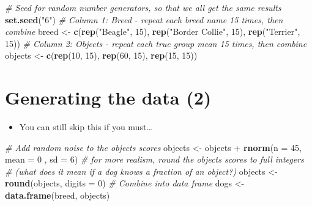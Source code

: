 \documentclass[]{article}
\newenvironment{Shaded}{}{}
\newcommand{\KeywordTok}[1]{\textcolor[rgb]{0.00,0.44,0.13}{\textbf{{#1}}}}
\newcommand{\DataTypeTok}[1]{\textcolor[rgb]{0.56,0.13,0.00}{{#1}}}
\newcommand{\DecValTok}[1]{\textcolor[rgb]{0.25,0.63,0.44}{{#1}}}
\newcommand{\StringTok}[1]{\textcolor[rgb]{0.25,0.44,0.63}{{#1}}}
\newcommand{\CommentTok}[1]{\textcolor[rgb]{0.38,0.63,0.69}{\textit{{#1}}}}
\newcommand{\NormalTok}[1]{{#1}}
\begin{document}
\begin{Shaded}
\begin{Highlighting}[]
\CommentTok{# Seed for random number generators, so that we all get the same results}
\KeywordTok{set.seed}\NormalTok{(}\StringTok{"6"}\NormalTok{)}
\CommentTok{# Column 1: Breed - repeat each breed name 15 times, then combine}
\NormalTok{breed <-}\StringTok{ }\KeywordTok{c}\NormalTok{(}\KeywordTok{rep}\NormalTok{(}\StringTok{"Beagle"}\NormalTok{, }\DecValTok{15}\NormalTok{), }\KeywordTok{rep}\NormalTok{(}\StringTok{"Border Collie"}\NormalTok{, }\DecValTok{15}\NormalTok{), }\KeywordTok{rep}\NormalTok{(}\StringTok{"Terrier"}\NormalTok{, }\DecValTok{15}\NormalTok{))}
\CommentTok{# Column 2: Objects - repeat each true group mean 15 times, then combine}
\NormalTok{objects <-}\StringTok{ }\KeywordTok{c}\NormalTok{(}\KeywordTok{rep}\NormalTok{(}\DecValTok{10}\NormalTok{, }\DecValTok{15}\NormalTok{), }\KeywordTok{rep}\NormalTok{(}\DecValTok{60}\NormalTok{, }\DecValTok{15}\NormalTok{), }\KeywordTok{rep}\NormalTok{(}\DecValTok{15}\NormalTok{, }\DecValTok{15}\NormalTok{))}
\end{Highlighting}
\end{Shaded}

\section{Generating the data (2)}\label{generating-the-data-2}

\begin{itemize}
\itemsep1pt\parskip0pt
\item
  You can still skip this if you must\ldots{}
\end{itemize}

\begin{Shaded}
\begin{Highlighting}[]
\CommentTok{# Add random noise to the objects scores}
\NormalTok{objects <-}\StringTok{ }\NormalTok{objects +}\StringTok{ }\KeywordTok{rnorm}\NormalTok{(}\DataTypeTok{n =} \DecValTok{45}\NormalTok{, }\DataTypeTok{mean =} \DecValTok{0} \NormalTok{, }\DataTypeTok{sd =} \DecValTok{6}\NormalTok{)}
\CommentTok{# for more realism, round the objects scores to full integers}
\CommentTok{# (what does it mean if a dog knows a fraction of an object?)}
\NormalTok{objects <-}\StringTok{ }\KeywordTok{round}\NormalTok{(objects, }\DataTypeTok{digits =} \DecValTok{0}\NormalTok{)}
\CommentTok{# Combine into data frame}
\NormalTok{dogs <-}\StringTok{ }\KeywordTok{data.frame}\NormalTok{(breed, objects)}
\end{Highlighting}
\end{Shaded}
\end{document}

